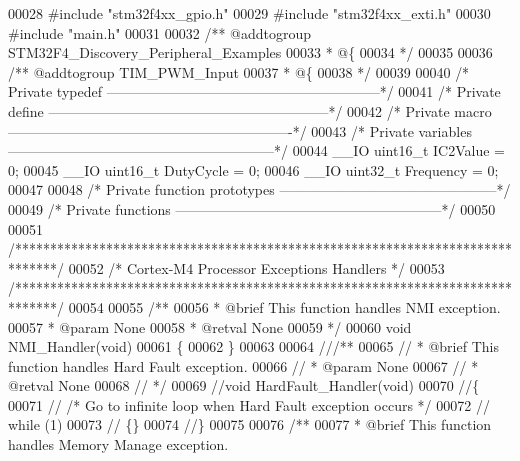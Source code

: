 \begin{DoxyCode}
00028 \textcolor{preprocessor}{#}\textcolor{preprocessor}{include} "stm32f4xx_gpio.h"
00029 \textcolor{preprocessor}{#}\textcolor{preprocessor}{include} "stm32f4xx_exti.h"
00030 \textcolor{preprocessor}{#}\textcolor{preprocessor}{include} "main.h"
00031 
00032 \textcolor{comment}{/** @addtogroup STM32F4\_Discovery\_Peripheral\_Examples}
00033 \textcolor{comment}{  * @\{}
00034 \textcolor{comment}{  */}
00035 
00036 \textcolor{comment}{/** @addtogroup TIM\_PWM\_Input}
00037 \textcolor{comment}{  * @\{}
00038 \textcolor{comment}{  */}
00039 
00040 \textcolor{comment}{/* Private typedef -----------------------------------------------------------*/}
00041 \textcolor{comment}{/* Private define ------------------------------------------------------------*/}
00042 \textcolor{comment}{/* Private macro -------------------------------------------------------------*/}
00043 \textcolor{comment}{/* Private variables ---------------------------------------------------------*/}
00044 \_\_IO uint16\_t IC2Value = 0;
00045 \_\_IO uint16\_t DutyCycle = 0;
00046 \_\_IO uint32\_t Frequency = 0;
00047 
00048 \textcolor{comment}{/* Private function prototypes -----------------------------------------------*/}
00049 \textcolor{comment}{/* Private functions ---------------------------------------------------------*/}
00050 
00051 \textcolor{comment}{/******************************************************************************/}
00052 \textcolor{comment}{/*            Cortex-M4 Processor Exceptions Handlers                         */}
00053 \textcolor{comment}{/******************************************************************************/}
00054 
00055 \textcolor{comment}{/**}
00056 \textcolor{comment}{  * @brief  This function handles NMI exception.}
00057 \textcolor{comment}{  * @param  None}
00058 \textcolor{comment}{  * @retval None}
00059 \textcolor{comment}{  */}
00060 \textcolor{keywordtype}{void} NMI_Handler(\textcolor{keywordtype}{void})
00061 \{
00062 \}
00063 
00064 \textcolor{comment}{///**}
00065 \textcolor{comment}{//  * @brief  This function handles Hard Fault exception.}
00066 \textcolor{comment}{//  * @param  None}
00067 \textcolor{comment}{//  * @retval None}
00068 \textcolor{comment}{//  */}
00069 \textcolor{comment}{//void HardFault\_Handler(void)}
00070 \textcolor{comment}{//\{}
00071 \textcolor{comment}{//  /* Go to infinite loop when Hard Fault exception occurs */}
00072 \textcolor{comment}{//  while (1)}
00073 \textcolor{comment}{//  \{\}}
00074 \textcolor{comment}{//\}}
00075 
00076 \textcolor{comment}{/**}
00077 \textcolor{comment}{  * @brief  This function handles Memory Manage exception.}

\end{DoxyCode}
